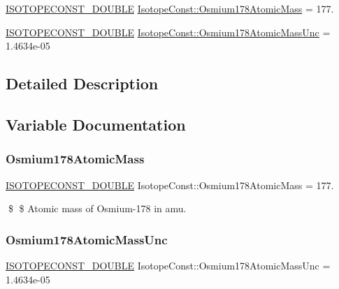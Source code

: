 \begin{DoxyCompactItemize}
\item 
\mbox{\hyperlink{group___isotope_const-_macros_ga8f45a7272ce02c0b4c65c44636ed719a}{I\+S\+O\+T\+O\+P\+E\+C\+O\+N\+S\+T\+\_\+\+D\+O\+U\+B\+LE}} \mbox{\hyperlink{group___isotope_const-_osmium-_os178_gae1f8e1da52e0a97aeb244d6fcb96d63f}{Isotope\+Const\+::\+Osmium178\+Atomic\+Mass}} = 177.
\item 
\mbox{\hyperlink{group___isotope_const-_macros_ga8f45a7272ce02c0b4c65c44636ed719a}{I\+S\+O\+T\+O\+P\+E\+C\+O\+N\+S\+T\+\_\+\+D\+O\+U\+B\+LE}} \mbox{\hyperlink{group___isotope_const-_osmium-_os178_ga031f8564ccce2c0e2ee6e2c721a5d3de}{Isotope\+Const\+::\+Osmium178\+Atomic\+Mass\+Unc}} = 1.\+4634e-\/05
\end{DoxyCompactItemize}


\subsection{Detailed Description}


\subsection{Variable Documentation}
\mbox{\label{group___isotope_const-_osmium-_os178_gae1f8e1da52e0a97aeb244d6fcb96d63f}} 
\subsubsection{\texorpdfstring{Osmium178\+Atomic\+Mass}{Osmium178AtomicMass}}
{\footnotesize\ttfamily \mbox{\hyperlink{group___isotope_const-_macros_ga8f45a7272ce02c0b4c65c44636ed719a}{I\+S\+O\+T\+O\+P\+E\+C\+O\+N\+S\+T\+\_\+\+D\+O\+U\+B\+LE}} Isotope\+Const\+::\+Osmium178\+Atomic\+Mass = 177.}

\$ \$ Atomic mass of Osmium-\/178 in amu. \mbox{\label{group___isotope_const-_osmium-_os178_ga031f8564ccce2c0e2ee6e2c721a5d3de}} 
\subsubsection{\texorpdfstring{Osmium178\+Atomic\+Mass\+Unc}{Osmium178AtomicMassUnc}}
{\footnotesize\ttfamily \mbox{\hyperlink{group___isotope_const-_macros_ga8f45a7272ce02c0b4c65c44636ed719a}{I\+S\+O\+T\+O\+P\+E\+C\+O\+N\+S\+T\+\_\+\+D\+O\+U\+B\+LE}} Isotope\+Const\+::\+Osmium178\+Atomic\+Mass\+Unc = 1.\+4634e-\/05}

